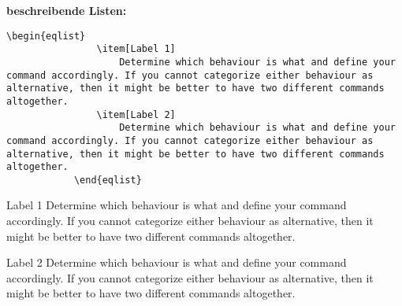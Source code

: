 \documentclass["WS\space 16-17\space -\space LaTeX-Kurs\space -\space Praesentation\space -\space 2.tex"]{subfiles}
\begin{document}
\begin{frame}[fragile]
    \textbf{\large{beschreibende Listen:}}\newline
    \Code*
        \begin{lstlisting}[gobble=12]
            \begin{eqlist}
                \item[Label 1]
                    Determine which behaviour is what and define your command accordingly. If you cannot categorize either behaviour as alternative, then it might be better to have two different commands altogether.
                \item[Label 2]
                    Determine which behaviour is what and define your command accordingly. If you cannot categorize either behaviour as alternative, then it might be better to have two different commands altogether.
            \end{eqlist}
        \end{lstlisting}
    \vspace{-0.3cm}
    \Ausgabe
        \begin{outputbox}
            \vspace{-0.3cm}
            \begin{eqlist}
                \item[Label 1]
                    Determine which behaviour is what and define your command accordingly. If you cannot categorize either behaviour as alternative, then it might be better to have two different commands altogether.
                \item[Label 2]
                    Determine which behaviour is what and define your command accordingly. If you cannot categorize either behaviour as alternative, then it might be better to have two different commands altogether.
            \end{eqlist}
            \vspace{-0.3cm}
        \end{outputbox}
\end{frame}
\end{document}
